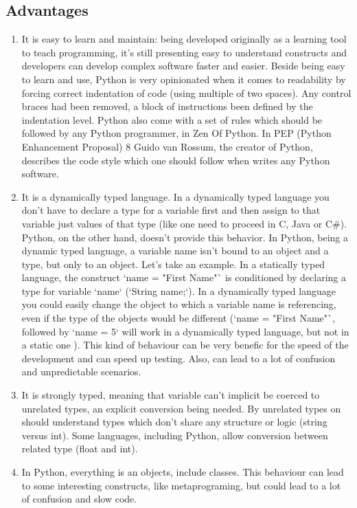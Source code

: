       \subsection{Advantages}
        \begin{enumerate}
          \item It is easy to learn and maintain: being developed originally as a learning tool to teach programming, it's still presenting easy to understand constructs and developers can develop complex software faster and easier. Beside being easy to learn and use, Python is very opinionated when it comes to readability by forcing correct indentation of code (using multiple of two spaces). Any control braces had been removed, a block of instructions been defined by the indentation level. Python also come with a set of rules which should be followed by any Python programmer, in Zen Of Python. In PEP (Python Enhancement Proposal) 8 \cite{PEP8} Guido van Rossum, the creator of Python, describes the code style which one should follow when writes any Python software.
          \item It is a dynamically typed language. In a dynamically typed language you don't have to declare a type for a variable first and then assign to that variable just values of that type (like one need to proceed in C, Java or C\#). Python, on the other hand, doesn't provide this behavior. In Python, being a dynamic typed language, a variable name isn't bound to an object and a type, but only to an object. Let's take an example. In a statically typed language, the construct `name = "First Name"` is conditioned by declaring a type for variable `name` (`String name;`). In a dynamically typed language you could easily change the object to which a variable name is referencing, even if the type of the objects would be different (`name = "First Name"`, followed by `name = 5` will work in a dynamically typed language, but not in  a static one ). This kind of behaviour can be very benefic for the speed of the development and can speed up testing. Also, can lead to a lot of confusion and unpredictable scenarios.
          \item It is strongly typed, meaning that variable can't implicit be coerced to unrelated types, an explicit conversion being needed. By unrelated types on should understand types which don't share any structure or logic (string versus int). Some languages, including Python, allow conversion between related type (float and int).
           \item In Python, everything is an objects, include classes. This behaviour can lead to some interesting constructs, like metaprograming, but could lead to a lot of confusion and slow code.

\end{enumerate}
